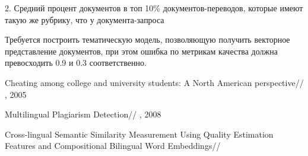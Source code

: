 \documentclass[12pt, twoside]{article}
\begin{document}
2. Средний процент документов в топ 10\% документов-переводов, которые имеют такую же рубрику, что у документа-запроса

Требуется построить тематическую модель, позволяющую получить векторное представление документов, при этом ошибка по метрикам качества должна превосходить 0.9 и 0.3 соответственно.


\begin{thebibliography}{3}

    Cheating among college and university students: A North American perspective//
    , 2005
    
    Multilingual Plagiarism Detection//
    , 2008
    
    Cross-lingual Semantic Similarity Measurement Using Quality Estimation Features and Compositional Bilingual Word Embeddings//

	  
\end{thebibliography}
\end{document}
